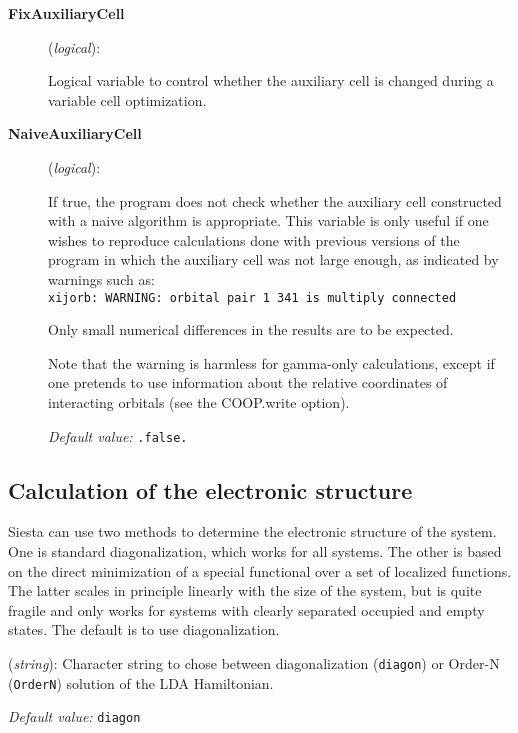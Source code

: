 \documentclass[11pt]{article}
\begin{document}
\begin{description}

\item[{\bf FixAuxiliaryCell}] ({\it logical}):

Logical variable to control whether the auxiliary cell is changed
during a variable cell optimization.

\item[{\bf NaiveAuxiliaryCell}] ({\it logical}):

If true, the program does not check whether the auxiliary cell
constructed with a naive algorithm is appropriate. This variable is
only useful if one wishes to reproduce calculations done with previous
versions of the program in which the auxiliary cell was not large
enough, as indicated by warnings such as:\\ \texttt{xijorb: WARNING:
  orbital pair 1 341 is multiply connected}

Only small numerical differences in the results are to be expected.

Note that the warning is harmless for gamma-only calculations, except
if one pretends to use information about the relative coordinates
of interacting orbitals (see the COOP.write option).

{\it Default value:} {\tt .false.}

\end{description}


\subsection{Calculation of the electronic structure}

{\sc Siesta} can use two methods to determine the electronic structure
of the system. One is standard diagonalization, which works for all
systems. The other is based on the direct minimization of a special
functional over a set of localized functions. The latter scales in
principle linearly with the size of the system, but is quite fragile
and only works for systems with clearly separated occupied and empty
states.  The default is to use diagonalization.

\begin{description}
\itemsep 10pt
\parsep 0pt

\item[{\bf SolutionMethod}] ({\it string}):
Character string to chose between
diagonalization ({\tt diagon}) or Order-N ({\tt OrderN}) solution
of the LDA Hamiltonian.

{\it Default value:} {\tt diagon}



\end{description}
\end{document}
